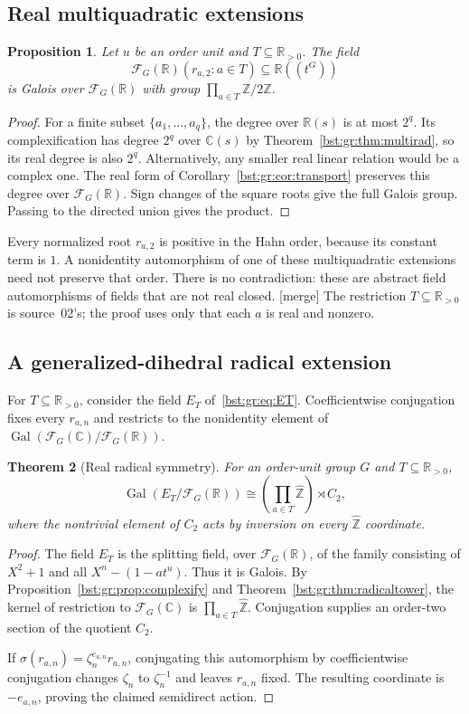 \documentclass[11pt,letterpaper]{article}
\newtheorem{theorem}{Theorem}[section]
\newtheorem{proposition}[theorem]{Proposition}
\theoremstyle{definition}
\theoremstyle{remark}
\newcommand{\R}{\mathbb R}
\newcommand{\C}{\mathbb C}
\newcommand{\Z}{\mathbb Z}
\newcommand{\HH}[2]{#1((t^{#2}))}
\newcommand{\FF}[2]{\mathcal F_{#2}(#1)}
\newcommand{\Gal}{\operatorname{Gal}}
\newcommand{\Zh}{\widehat{\Z}}
\begin{document}
\subsection{Real multiquadratic extensions}

\begin{proposition}\label{bst:gr:prop:realquad}
Let $u$ be an order unit and $T\subseteq\R_{>0}$. The field
\[
 \FF{\R}G(r_{a,2}:a\in T)\subseteq\HH{\R}G
\]
is Galois over $\FF{\R}G$ with group $\prod_{a\in T}\Z/2\Z$.
\end{proposition}
\begin{proof}
For a finite subset $\{a_1,\ldots,a_q\}$, the degree over $\R(s)$ is at most
$2^q$. Its complexification has degree $2^q$ over $\C(s)$ by
Theorem~\ref{bst:gr:thm:multirad}, so its real degree is also $2^q$.
Alternatively, any smaller real linear relation would be a complex one. The
real form of Corollary~\ref{bst:gr:cor:transport} preserves this degree over
$\FF{\R}G$. Sign changes of the square roots give the full Galois group.
Passing to the directed union gives the product.
\end{proof}

Every normalized root $r_{a,2}$ is positive in the Hahn order, because its
constant term is $1$. A nonidentity automorphism of one of these
multiquadratic extensions need not preserve that order. There is no
contradiction: these are abstract field automorphisms of fields that are not
real closed. \textup{[merge]} The restriction $T\subseteq\R_{>0}$ is
source~02's; the proof uses only that each $a$ is real and nonzero.

\subsection{A generalized-dihedral radical extension}

For $T\subseteq\R_{>0}$, consider the field $E_T$ of~\eqref{bst:gr:eq:ET}.
Coefficientwise conjugation fixes every $r_{a,n}$ and restricts to the
nonidentity element of $\Gal(\FF{\C}G/\FF{\R}G)$.

\begin{theorem}[Real radical symmetry]\label{bst:gr:thm:dihedral}
For an order-unit group $G$ and $T\subseteq\R_{>0}$,
\[
 \Gal(E_T/\FF{\R}G)\cong\left(\prod_{a\in T}\Zh\right)\rtimes C_2,
\]
where the nontrivial element of $C_2$ acts by inversion on every $\Zh$
coordinate.
\end{theorem}
\begin{proof}
The field $E_T$ is the splitting field, over $\FF{\R}G$, of the family
consisting of $X^2+1$ and all $X^n-(1-at^u)$. Thus it is Galois. By
Proposition~\ref{bst:gr:prop:complexify} and
Theorem~\ref{bst:gr:thm:radicaltower}, the kernel of restriction to
$\FF{\C}G$ is $\prod_{a\in T}\Zh$. Conjugation supplies an order-two section
of the quotient $C_2$.

If $\sigma(r_{a,n})=\zeta_n^{e_{a,n}}r_{a,n}$, conjugating this automorphism
by coefficientwise conjugation changes $\zeta_n$ to $\zeta_n^{-1}$ and leaves
$r_{a,n}$ fixed. The resulting coordinate is $-e_{a,n}$, proving the claimed
semidirect action.
\end{proof}
\end{document}
